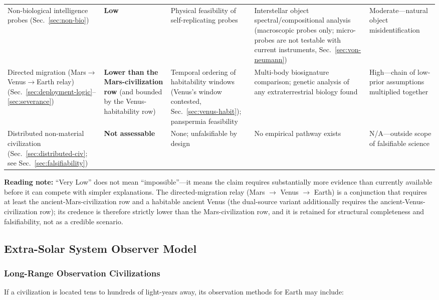 \documentclass[aps,prd,twocolumn,superscriptaddress,nofootinbib]{revtex4-2}
\begin{document}
\begin{table}[htbp]
\begin{tabular}{P{0.155\textwidth}P{0.090\textwidth}P{0.204\textwidth}P{0.244\textwidth}P{0.155\textwidth}}
Non-biological intelligence probes (Sec.~\ref{sec:non-bio}) & \textbf{Low} & Physical feasibility of self-replicating probes~\cite{Freitas1980} & Interstellar object spectral/compositional analysis (macroscopic probes only; micro-probes are not testable with current instruments, Sec.~\ref{sec:von-neumann}) & Moderate---natural object misidentification \\
Directed migration (Mars$\to$Venus$\to$Earth relay) (Sec.~\ref{sec:deployment-logic}--\ref{sec:severance}) & \textbf{Lower than the Mars-civilization row} (and bounded by the Venus-habitability row) & Temporal ordering of habitability windows (Venus's window contested, Sec.~\ref{sec:venus-habit}); panspermia feasibility & Multi-body biosignature comparison; genetic analysis of any extraterrestrial biology found & High---chain of low-prior assumptions multiplied together \\
Distributed non-material civilization (Sec.~\ref{sec:distributed-civ}; see Sec.~\ref{sec:falsifiability}) & \textbf{Not assessable} & None; unfalsifiable by design & No empirical pathway exists & N/A---outside scope of falsifiable science \\
\bottomrule
\end{tabular}
\end{table}

\textbf{Reading note:} ``Very Low'' does not mean ``impossible''---it means the claim requires substantially more evidence than currently available before it can compete with simpler explanations. The directed-migration relay (Mars $\to$ Venus $\to$ Earth) is a conjunction that requires at least the ancient-Mars-civilization row and a habitable ancient Venus (the dual-source variant additionally requires the ancient-Venus-civilization row); its credence is therefore strictly lower than the Mars-civilization row, and it is retained for structural completeness and falsifiability, not as a credible scenario.

\subsection{Extra-Solar System Observer Model}\label{sec:observer-model}

\subsubsection{Long-Range Observation Civilizations}\label{sec:long-range}

If a civilization is located tens to hundreds of light-years away, its observation methods for Earth may include:
\end{document}
